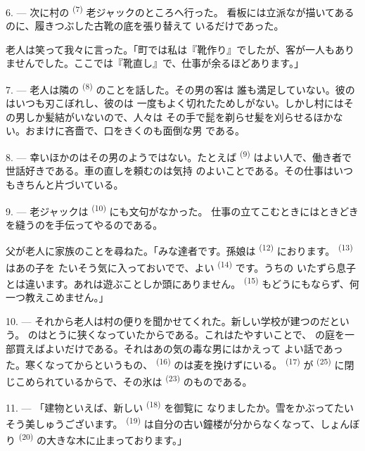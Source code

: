 6. --- 次に村の \textsuperscript{(7)} 老ジャックのところへ行った。
看板には立派なが描いてあるのに、履きつぶした古靴の底を張り替えて
いるだけであった。

老人は笑って我々に言った。「町では私は『靴作り』でしたが、客が一人もあり
ませんでした。ここでは『靴直し』で、仕事が余るほどあります。」

7. --- 老人は隣の \textsuperscript{(8)} のことを話した。その男の客は
誰も満足していない。彼のはいつも刃こぼれし、彼のは
一度もよく切れたためしがない。しかし村にはその男しか髪結がいないので、人々は
その手で髭を剃らせ髪を刈らせるほかない。おまけに吝嗇で、口をきくのも面倒な男
である。

8. --- 幸いほかのはその男のようではない。たとえば
\textsuperscript{(9)} はよい人で、働き者で世話好きである。車の直しを頼むのは気持
のよいことである。その仕事はいつもきちんと片づいている。

9. --- 老ジャックは \textsuperscript{(10)} にも文句がなかった。
仕事の立てこむときにはときどきを縫うのを手伝ってやるのである。

父が老人に家族のことを尋ねた。「みな達者です。孫娘は
\textsuperscript{(12)} におります。 \textsuperscript{(13)} はあの子を
たいそう気に入っておいでで、よい \textsuperscript{(14)} です。うちの
いたずら息子とは違います。あれは遊ぶことしか頭にありません。
\textsuperscript{(15)} もどうにもならず、何一つ教えこめません。」

\VUsaut{3.0mm}
\VUsaut{3.0mm}

10. --- それから老人は村の便りを聞かせてくれた。新しい学校が建つのだという。
のはとうに狭くなっていたからである。これはたやすいことで、
の庭を一部買えばよいだけである。それはあの気の毒な男にはかえって
よい話であった。寒くなってからというもの、 \textsuperscript{(16)}
のは麦を挽けずにいる。 \textsuperscript{(17)} が
 \textsuperscript{(25)} に閉じこめられているからで、その氷は
 \textsuperscript{(23)} のものである。

11. --- 「建物といえば、新しい \textsuperscript{(18)} を御覧に
なりましたか。雪をかぶってたいそう美しゅうございます。
\textsuperscript{(19)} は自分の古い鐘楼が分からなくなって、しょんぼり
 \textsuperscript{(20)} の大きな木に止まっております。」


